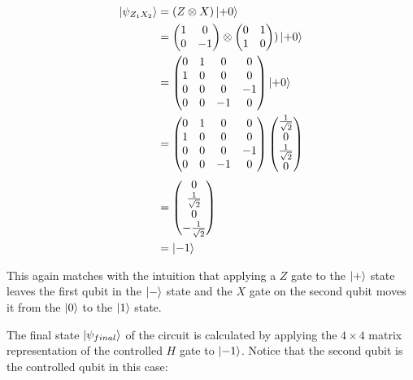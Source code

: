 \begin{align}
  \Ket{\psi_{Z_1X_2}}  &= (Z \otimes X) \Ket{+0} \\
                    &= \begin{pmatrix} 1 & 0 \\ 0 & -1 \end{pmatrix} \otimes \begin{pmatrix} 0 & 1 \\ 1 & 0 \end{pmatrix}) \Ket{+0} \\
                    &= \begin{pmatrix} 0 & 1 & 0 & 0 \\ 1 & 0 & 0 & 0 \\ 0 & 0 & 0 & -1 \\ 0 & 0 & -1 & 0 \end{pmatrix} \Ket{+0} \\
                    &= \begin{pmatrix} 0 & 1 & 0 & 0 \\ 1 & 0 & 0 & 0 \\ 0 & 0 & 0 & -1 \\ 0 & 0 & -1 & 0 \end{pmatrix} \begin{pmatrix} \frac{1}{\sqrt{2}} \\ 0 \\ \frac{1}{\sqrt{2}} \\ 0 \end{pmatrix} \\
                    &= \begin{pmatrix} 0 \\ \frac{1}{\sqrt{2}} \\ 0 \\ -\frac{1}{\sqrt{2}} \end{pmatrix} \\
                    &= \Ket{-1}
\end{align}

This again matches with the intuition that applying a $Z$ gate to the $\Ket{+}$
state leaves the first qubit in the $\Ket{-}$ state and the $X$ gate on the
second qubit moves it from the $\Ket{0}$ to the $\Ket{1}$ state.

The final state $\Ket{\psi_{final}}$ of the circuit is calculated by applying the $4 \times 4$ matrix
representation of the controlled $H$ gate to $\Ket{-1}$. Notice that the second
qubit is the controlled qubit in this case:

